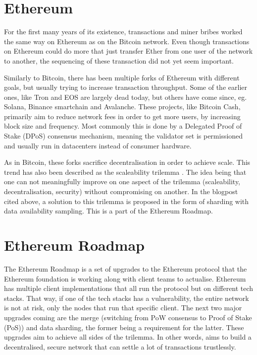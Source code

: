
\section{Ethereum}

For the first many years of its existence, transactions and miner bribes worked the same way on Ethereum as on the Bitcoin network. Even though transactions on Ethereum could do more that just transfer Ether from one user of the network to another, the sequencing of these transaction did not yet seem important. 

Similarly to Bitcoin, there has been multiple forks of Ethereum with different goals, but usually trying to increase transaction throughput. Some of the earlier ones, like Tron and EOS are largely dead today, but others have come since, eg. Solana, Binance smartchain and Avalanche. These projects, like Bitcoin Cash, primarily aim to reduce network fees in order to get more users, by increasing block size and frequency. Most commonly this is done by a Delegated Proof of Stake (DPoS) consensus mechanism, meaning the validator set is permissioned and usually run in datacenters instead of consumer hardware. 

As in Bitcoin, these forks sacrifice decentralisation in order to achieve scale. This trend has also been described as the scaleability trilemma \cite{vitalikscale}. The idea being that one can not meaningfully improve on one aspect of the trilemma (scaleability, decentralisation, security) without compromising on another. In the blogpost cited above, a solution to this trilemma is proposed in the form of sharding with data availability sampling. This is a part of the Ethereum Roadmap.

\section{Ethereum Roadmap}

The Ethereum Roadmap is a set of upgrades to the Ethereum protocol that the Ethereum foundation is working along with client teams to actualise. Ethereum has multiple client implementations that all run the protocol but on different tech stacks. That way, if one of the tech stacks has a vulnerability, the entire network is not at risk, only the nodes that run that specific client. The next two major upgrades coming are the merge (switching from PoW consensus to Proof of Stake (PoS)) and data sharding, the former being a requirement for the latter. These upgrades aim to achieve all sides of the trilemma. In other words, aims to build a decentralised, secure network that can settle a lot of transactions trustlessly. 

